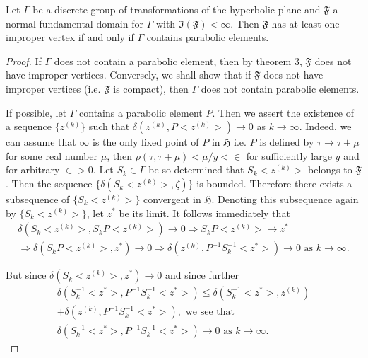 \begin{thm}
Let $\Gamma$ be a discrete group of transformations of the hyperbolic
plane and $\mathfrak{F}$ a normal fundamental domain for $\Gamma$ with
$\mathfrak{I}(\mathfrak{F})<\infty$. Then $\mathfrak{F}$ has at least
one improper vertex if and only if $\Gamma$ contains parabolic elements.
\end{thm}

\begin{proof}
If $\Gamma$ does not contain a parabolic element, then by theorem 3,
$\mathfrak{F}$ does not have improper vertices. Conversely, we shall
show that if $\mathfrak{F}$ does not have improper vertices
(i.e. $\mathfrak{F}$ is compact), then $\Gamma$ does not contain
parabolic elements. 

If possible, let $\Gamma$ contains a parabolic element $P$. Then we
assert the existence of a sequence $\{z^{(k)}\}$ such that
$\delta(z^{(k)}, P < z^{(k)}>) \to 0$ as $k\to \infty$. Indeed, we can
assume that $\infty$ is the only fixed point of $P$ in $\mathfrak{H}$
i.e. $P$ is defined by $\tau \to \tau + \mu$ for some real number
$\mu$, then $\rho(\tau, \tau + \mu)< \mu/y < \in$ for
sufficiently large $y$ and for arbitrary $\in >0$. Let $S_k
\in \Gamma$ be so determined that $S_k <z^{(k)}>$ belongs to
$\mathfrak{F}$. Then the sequence $\{\delta (S_k<z^{(k)}>, \zeta)\}$
is bounded. Therefore there exists a subsequence of $\{S_k<z^{(k)}>\}$
convergent in $\mathfrak{H}$. Denoting this subsequence again by
$\{S_k <z^{(k)}>\}$, let $z^{\ast}$ be its limit. It follows
immediately that \pageoriginale
\begin{gather*}
\delta (S_k<z^{(k)}>, S_k P <z^{(k)}>) \to 0 \Longrightarrow S_k P
<z^{(k)}> \to z^{\ast}\\
\Longrightarrow\delta (S_k P <z^{(k)}>, z^{\ast}) \to 0
\Longrightarrow \delta (z^{(k)}, P^{-1} S^{-1}_{k}<z^{\ast}>) \to 0
\text{ as } k \to \infty. 
\end{gather*}

But since $\delta(S_k <z^{(k)}>, z^{\ast}) \to 0$ and since further
\begin{gather*}
\delta(S^{-1}_k <z^{\ast}>, P^{-1}S^{-1}_k <z^{\ast}>) \leq \delta
(S^{-1}_k <z^{\ast}>, z^{(k)})\\
 + \delta(z^{(k)}, P^{-1}S^{-1}_k
<z^{\ast}>), \text{ we see that }\\
\delta (S^{-1}_k <z^{\ast}>, P^{-1} S^{-1}_k <z^{\ast}>) \to 0 
\text{ as } k  \to \infty. 
\end{gather*}


\end{proof}
